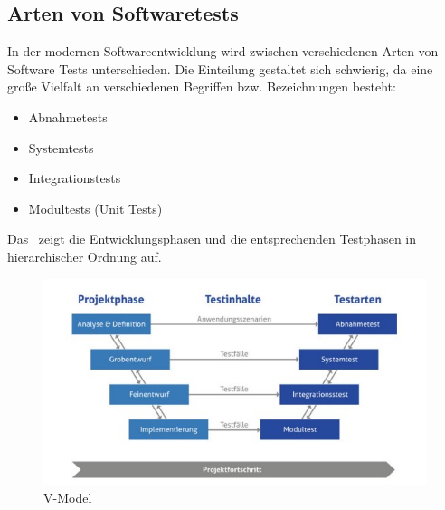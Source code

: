 	\subsection{Arten von Softwaretests}
	In der modernen Softwareentwicklung wird zwischen verschiedenen Arten von Software Tests unterschieden. Die Einteilung gestaltet sich schwierig, da eine große Vielfalt an verschiedenen Begriffen bzw. Bezeichnungen besteht\cite{DanielLindner.2020}:
\begin{itemize}
	\item Abnahmetests
	\item Systemtests
	\item Integrationstests
	\item Modultests (Unit Tests)
\end{itemize}
Das \dq {}\dq~zeigt die Entwicklungsphasen und die entsprechenden Testphasen in hierarchischer Ordnung auf.
\begin{figure}[h]
  \centering
   \includegraphics[width=1\textwidth]{img/V-Model.jpg} 
   \caption[V-Model]{ V-Model \cite{Witte.2016}}
   \label{fig:V-Model.jpg}
\end{figure}
\newpage
